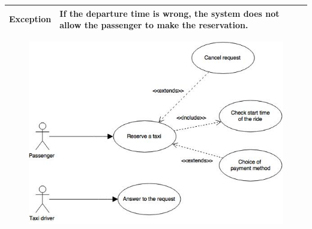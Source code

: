 \documentclass[18pt,oneside,a4paper, titlepage]{article}
\begin{document}
\begin{itemize}
\begin{center}
\begin{tabular}{|c|p{8cm}|}
						\hline \textbf{Exception} & If the departure time is wrong, the system does not allow the passenger to make the reservation.\\
						\hline
					\end{tabular}
					\vspace{1cm}
					\begin{figure}[h]
						\centering
						\includegraphics[scale=0.6]{Diagrams/UseCaseReserve.jpg}
					\end{figure}
				\end{center}
				
				\newpage
				

\end{itemize}
\end{document}
